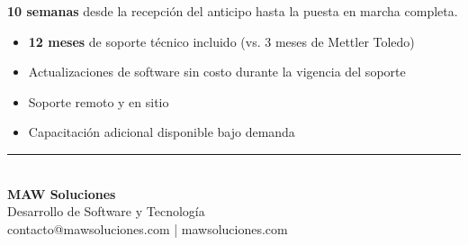 \documentclass[11pt]{article}
\begin{document}
\begin{cajaTip}
\textbf{10 semanas} desde la recepción del anticipo hasta la puesta en marcha completa.
\end{cajaTip}


\begin{itemize}
    \item \textbf{12 meses} de soporte técnico incluido (vs. 3 meses de Mettler Toledo)
    \item Actualizaciones de software sin costo durante la vigencia del soporte
    \item Soporte remoto y en sitio
    \item Capacitación adicional disponible bajo demanda
\end{itemize}

\vfill
\begin{center}
{\color{pharmaazul}\rule{0.4\linewidth}{1.2pt}}\\[10pt]
{\large\bfseries\color{tinta}MAW Soluciones}\\[4pt]
{\normalsize\color{gristexto}Desarrollo de Software y Tecnología}\\[4pt]
{\footnotesize\color{gristexto}contacto@mawsoluciones.com | mawsoluciones.com}
\end{center}
\end{document}

